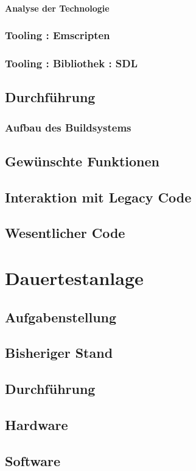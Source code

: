 \paragraph*{Analyse der Technologie}

\subsubsection{Tooling : Emscripten}
\subsubsection{Tooling : Bibliothek : SDL}
\subsection{Durchführung}
\subsubsection{Aufbau des Buildsystems}
\subsection{Gewünschte Funktionen}
\subsection{Interaktion mit Legacy Code}
\subsection{Wesentlicher Code}

\section{Dauertestanlage}
\subsection{Aufgabenstellung}
\subsection{Bisheriger Stand}
\subsection{Durchführung}
\subsection{Hardware}
\subsection{Software}

